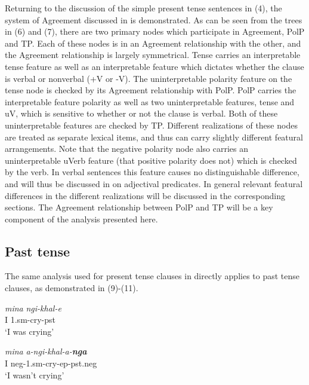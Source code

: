 \documentclass[output=paper]{langsci/langscibook}
\begin{document}
Returning to the discussion of the simple present tense sentences in (4), the system of Agreement discussed in  is demonstrated. As can be seen from the trees in (6) and (7), there are two primary nodes which participate in Agreement, PolP and TP. Each of these nodes is in an Agreement relationship with the other, and the Agreement relationship is largely symmetrical. Tense carries an interpretable tense feature as well as an interpretable feature which dictates whether the clause is verbal or nonverbal (+V or -V). The uninterpretable polarity feature on the tense node is checked by its Agreement relationship with PolP. PolP carries the interpretable feature polarity as well as two uninterpretable features, tense and uV, which is sensitive to whether or not the clause is verbal. Both of these uninterpretable features are checked by TP. Different realizations of these nodes are treated as separate lexical items, and thus can carry slightly different featural arrangements. Note that the negative polarity node also carries an uninterpretable uVerb feature (that positive polarity does not) which is checked by the verb. In verbal sentences this feature causes no distinguishable difference, and will thus be discussed in  on adjectival predicates. In general relevant featural differences in the different realizations will be discussed in the corresponding sections. The Agreement relationship between PolP and TP will be a key component of the analysis presented here.


\subsection{Past tense}

The same analysis used for present tense clauses in  directly applies to past tense clauses, as demonstrated in (9)-(11).



\begin{exe}
\ex \begin{xlist}
\ex \gll \textit{mina} \textit{ngi-khal-e}\\
         I 1.{\sc sm}-cry-{\sc pst}\\
    \glt `I was crying'




\ex \gll \textit{mina} \textit{a-ngi-khal-a-\textbf{nga}}\\
         I {\sc neg}-1.{\sc sm}-cry-{\sc ep}-{\sc pst.neg}\\
    \glt `I wasn't crying'
\end{xlist}
\end{exe}
\end{document}
